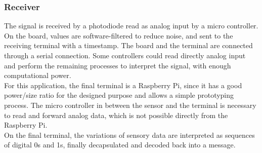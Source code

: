 
\subsubsection{Receiver}
The signal is received by a photodiode read as analog input by a micro controller.
On the board, values are software-filtered to reduce noise, and sent to the receiving terminal with a timestamp.
The board and the terminal are connected through a serial connection.
Some controllers could read directly analog input and perform the remaining processes to interpret the signal, with enough computational power.\\ 
For this application, the final terminal is a Raspberry Pi, since it has a good power/size ratio for the designed purpose and allows a simple prototyping process. The micro controller in between the sensor and the terminal is necessary to read and forward analog data, which is not possible directly from the Raspberry Pi.\\
On the final terminal, the variations of sensory data are interpreted as sequences of digital 0s and 1s, finally decapsulated and decoded back into a message.

